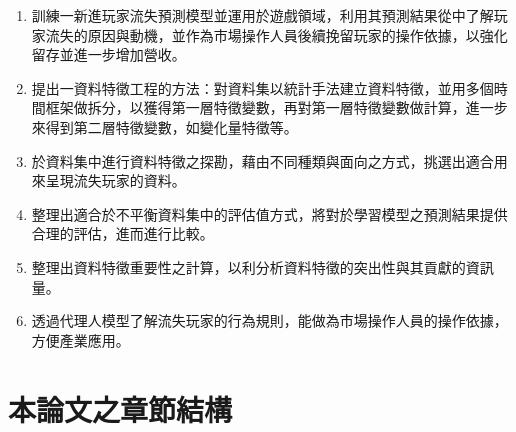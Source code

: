 \begin{enumerate}
    \item 訓練一新進玩家流失預測模型並運用於遊戲領域，利用其預測結果從中了解玩家流失的原因與動機，並作為市場操作人員後續挽留玩家的操作依據，以強化留存並進一步增加營收。
    \item 提出一資料特徵工程的方法：對資料集以統計手法建立資料特徵，並用多個時間框架做拆分，以獲得第一層特徵變數，再對第一層特徵變數做計算，進一步來得到第二層特徵變數，如變化量特徵等。
    \item 於資料集中進行資料特徵之探勘，藉由不同種類與面向之方式，挑選出適合用來呈現流失玩家的資料。
    \item 整理出適合於不平衡資料集中的評估值方式，將對於學習模型之預測結果提供合理的評估，進而進行比較。
    \item 整理出資料特徵重要性之計算，以利分析資料特徵的突出性與其貢獻的資訊量。
    \item 透過代理人模型了解流失玩家的行為規則，能做為市場操作人員的操作依據，方便產業應用。
\end{enumerate}

\section{本論文之章節結構}

\newpage